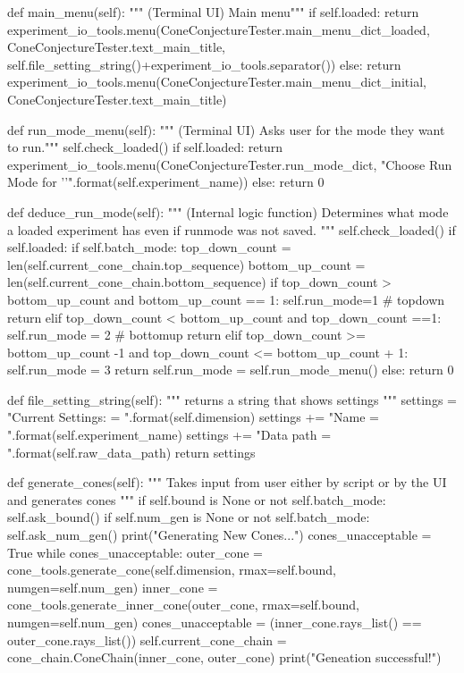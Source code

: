 \documentclass{TC}
\begin{document}
\begin{SAGE}
	def main_menu(self):
		""" (Terminal UI) Main menu"""
		if self.loaded:
			return experiment_io_tools.menu(ConeConjectureTester.main_menu_dict_loaded, ConeConjectureTester.text_main_title, self.file_setting_string()+experiment_io_tools.separator())
		else:
			return experiment_io_tools.menu(ConeConjectureTester.main_menu_dict_initial, ConeConjectureTester.text_main_title)


	def run_mode_menu(self):
		""" (Terminal UI) Asks user for the mode they want to run."""
		self.check_loaded()
		if self.loaded:
			return experiment_io_tools.menu(ConeConjectureTester.run_mode_dict, "Choose Run Mode for '{}'".format(self.experiment_name))
		else:
			return 0

	def deduce_run_mode(self):
		""" (Internal logic function) Determines what mode a loaded experiment has even 
			if runmode was not saved. """
		self.check_loaded()
		if self.loaded:
			if self.batch_mode:
				top_down_count = len(self.current_cone_chain.top_sequence)
				bottom_up_count = len(self.current_cone_chain.bottom_sequence)
				if top_down_count > bottom_up_count and bottom_up_count == 1:
					self.run_mode=1 # topdown
					return
				elif top_down_count < bottom_up_count and top_down_count ==1:
					self.run_mode = 2 # bottomup
					return
				elif top_down_count >= bottom_up_count -1 and top_down_count <= bottom_up_count + 1:
					self.run_mode = 3
					return
			self.run_mode = self.run_mode_menu()
		else:
			return 0

	def file_setting_string(self):
		""" returns a string that shows settings """
		settings = "Current Settings: \n\tDimension = {}\n".format(self.dimension)
		settings += "\tExperiment Name = {}\n".format(self.experiment_name)
		settings += "\tRaw Data path = {}\n".format(self.raw_data_path)
		return settings


	def generate_cones(self):
		""" Takes input from user either by script or by the UI and generates cones """
		if self.bound is None or not self.batch_mode:
			self.ask_bound()
		if self.num_gen is None or not self.batch_mode:
			self.ask_num_gen()
		print("Generating New Cones...")
		cones_unacceptable = True
		while cones_unacceptable:
			outer_cone = cone_tools.generate_cone(self.dimension, rmax=self.bound, numgen=self.num_gen)
			inner_cone = cone_tools.generate_inner_cone(outer_cone, rmax=self.bound, numgen=self.num_gen)
			cones_unacceptable = (inner_cone.rays_list() == outer_cone.rays_list())
		self.current_cone_chain = cone_chain.ConeChain(inner_cone, outer_cone)
		print("Geneation successful!")
				 

\end{SAGE}
\end{document}
